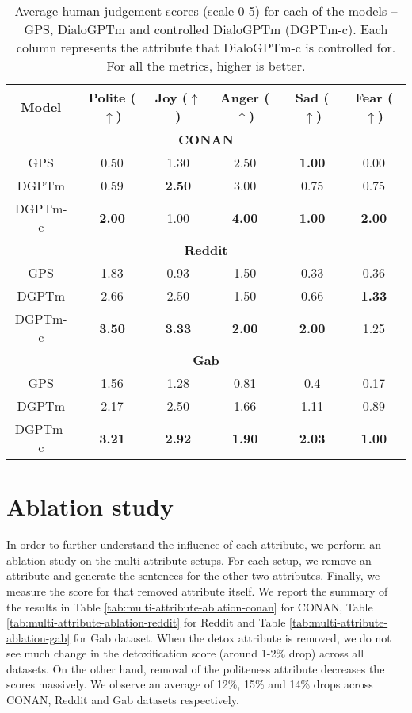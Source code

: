 \begin{table}[]
\centering
\scriptsize
\begin{tabular}{|c|c|c|c|c|c|}
\hline
\textbf{Model} & \textbf{Polite} ($\uparrow$) & \textbf{Joy} ($\uparrow$) & \textbf{Anger} ($\uparrow$)& \textbf{Sad} ($\uparrow$)& \textbf{Fear} ($\uparrow$)\\\hline

\multicolumn{6}{|c|}{\textbf{CONAN}}                    \\ \hline
GPS         & 0.50 & 1.30 & 2.50 & \textbf{1.00} & 0.00 \\
DGPTm    & 0.59 & \textbf{2.50} & 3.00 & 0.75 & 0.75 \\
DGPTm-c & \textbf{2.00} & 1.00 & \textbf{4.00} & \textbf{1.00} & \textbf{2.00} \\ \hline
\multicolumn{6}{|c|}{\textbf{Reddit}}                   \\ \hline
GPS         & 1.83 & 0.93 & 1.50 & 0.33 & 0.36 \\
DGPTm    & 2.66 & 2.50 & 1.50 & 0.66 & \textbf{1.33} \\
DGPTm-c & \textbf{3.50} & \textbf{3.33} & \textbf{2.00} & \textbf{2.00} & 1.25 \\ \hline
\multicolumn{6}{|c|}{\textbf{Gab}}                      \\ \hline
GPS         & 1.56 & 1.28 & 0.81 & 0.4  & 0.17 \\
DGPTm    & 2.17 & 2.50 & 1.66 & 1.11 & 0.89 \\
DGPTm-c & \textbf{3.21} & \textbf{2.92} & \textbf{1.90} &\textbf{ 2.03} & \textbf{1.00}\\ \hline
\end{tabular}
\caption{\scriptsize{Average human judgement scores (scale 0-5) for each of the models -- GPS, DialoGPTm and controlled DialoGPTm (DGPTm-c). Each column represents the attribute that DialoGPTm-c is controlled for. For all the metrics, higher is better.}}
\label{tab:human-evaluation-control}
\end{table}

\section{Ablation study}

In order to further understand the influence of each attribute, we perform an ablation study on the multi-attribute setups. For each setup, we remove an attribute and generate the sentences for the other two attributes. Finally, we measure the score for that removed attribute itself. We report the summary of the results in Table \ref{tab:multi-attribute-ablation-conan} for CONAN, Table \ref{tab:multi-attribute-ablation-reddit} for Reddit and  Table \ref{tab:multi-attribute-ablation-gab} for Gab dataset. When the detox attribute is removed, we do not see much change in the detoxification score (around 1-2\% drop) across all datasets. On the other hand, removal of the politeness attribute decreases the scores massively. We observe an average of 12\%, 15\% and 14\% drops across CONAN, Reddit and Gab datasets respectively.

